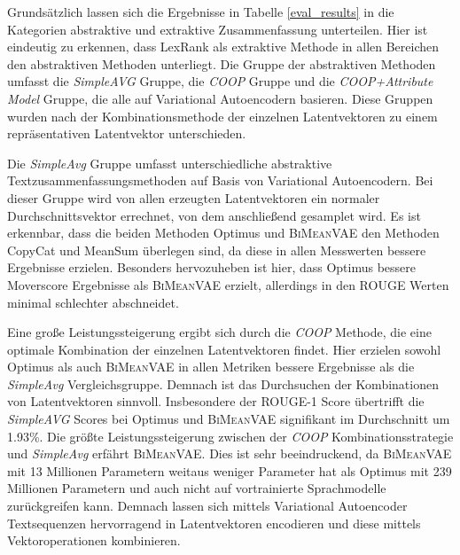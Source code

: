 Grundsätzlich lassen sich die Ergebnisse in Tabelle \ref{eval_results} in die Kategorien abstraktive und extraktive Zusammenfassung unterteilen.
Hier ist eindeutig zu erkennen, dass LexRank als extraktive Methode in allen Bereichen den abstraktiven Methoden unterliegt. 
Die Gruppe der abstraktiven Methoden umfasst die \textit{SimpleAVG} Gruppe, die \textit{COOP} Gruppe und die \textit{COOP+Attribute Model} Gruppe, die alle auf Variational Autoencodern basieren.
Diese Gruppen wurden nach der Kombinationsmethode der einzelnen Latentvektoren zu einem repräsentativen Latentvektor unterschieden.


Die \textit{SimpleAvg} Gruppe umfasst unterschiedliche abstraktive Textzusammenfassungsmethoden auf Basis von Variational Autoencodern.
Bei dieser Gruppe wird von allen erzeugten Latentvektoren ein normaler Durchschnittsvektor errechnet, von dem anschließend gesamplet wird.
Es ist erkennbar, dass die beiden Methoden Optimus und \textsc{BiMeanVAE} den Methoden CopyCat und MeanSum überlegen sind, da diese in allen Messwerten bessere Ergebnisse erzielen.
Besonders hervozuheben ist hier, dass Optimus bessere Moverscore Ergebnisse als \textsc{BiMeanVAE} erzielt, allerdings in den ROUGE Werten minimal schlechter abschneidet. 

Eine große Leistungssteigerung ergibt sich durch die \textit{COOP} Methode, die eine optimale Kombination der einzelnen Latentvektoren findet.
Hier erzielen sowohl Optimus als auch \textsc{BiMeanVAE} in allen Metriken bessere Ergebnisse als die \textit{SimpleAvg} Vergleichsgruppe.
Demnach ist das Durchsuchen der Kombinationen von Latentvektoren sinnvoll. 
Insbesondere der ROUGE-1 Score übertrifft die \textit{SimpleAVG} Scores bei Optimus und \textsc{BiMeanVAE} signifikant im Durchschnitt um 1.93\%.  %
Die größte Leistungssteigerung zwischen der \textit{COOP} Kombinationsstrategie und \textit{SimpleAvg} erfährt \textsc{BiMeanVAE}.
Dies ist sehr beeindruckend, da \textsc{BiMeanVAE} mit 13 Millionen Parametern weitaus weniger Parameter hat als Optimus mit 239 Millionen Parametern und auch nicht auf vortrainierte Sprachmodelle zurückgreifen kann.
Demnach lassen sich mittels Variational Autoencoder Textsequenzen hervorragend in Latentvektoren encodieren und diese mittels Vektoroperationen kombinieren.


